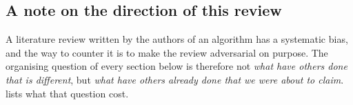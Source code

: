 \subsection{A note on the direction of this review}

A literature review written by the authors of an algorithm has a systematic
bias, and the way to counter it is to make the review adversarial on purpose.
The organising question of every section below is therefore not \emph{what have
others done that is different}, but \emph{what have others already done that we
were about to claim}.  lists what that question cost.
